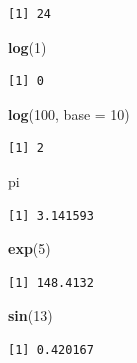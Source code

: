 \documentclass[]{book}
\newenvironment{Shaded}{\begin{snugshade}}{\end{snugshade}}
\newcommand{\KeywordTok}[1]{\textcolor[rgb]{0.13,0.29,0.53}{\textbf{#1}}}
\newcommand{\DataTypeTok}[1]{\textcolor[rgb]{0.13,0.29,0.53}{#1}}
\newcommand{\DecValTok}[1]{\textcolor[rgb]{0.00,0.00,0.81}{#1}}
\newcommand{\NormalTok}[1]{#1}
\theoremstyle{definition}
\theoremstyle{definition}
\theoremstyle{definition}
\theoremstyle{remark}
\begin{document}
\begin{verbatim}
[1] 24
\end{verbatim}

\begin{Shaded}
\begin{Highlighting}[]
\KeywordTok{log}\NormalTok{(}\DecValTok{1}\NormalTok{)}
\end{Highlighting}
\end{Shaded}

\begin{verbatim}
[1] 0
\end{verbatim}

\begin{Shaded}
\begin{Highlighting}[]
\KeywordTok{log}\NormalTok{(}\DecValTok{100}\NormalTok{, }\DataTypeTok{base =} \DecValTok{10}\NormalTok{)}
\end{Highlighting}
\end{Shaded}

\begin{verbatim}
[1] 2
\end{verbatim}

\begin{Shaded}
\begin{Highlighting}[]
\NormalTok{pi}
\end{Highlighting}
\end{Shaded}

\begin{verbatim}
[1] 3.141593
\end{verbatim}

\begin{Shaded}
\begin{Highlighting}[]
\KeywordTok{exp}\NormalTok{(}\DecValTok{5}\NormalTok{)}
\end{Highlighting}
\end{Shaded}

\begin{verbatim}
[1] 148.4132
\end{verbatim}

\begin{Shaded}
\begin{Highlighting}[]
\KeywordTok{sin}\NormalTok{(}\DecValTok{13}\NormalTok{)}
\end{Highlighting}
\end{Shaded}

\begin{verbatim}
[1] 0.420167
\end{verbatim}
\end{document}
